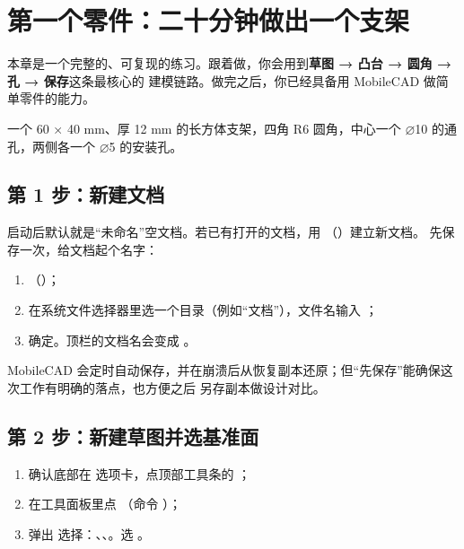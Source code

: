 \chapter{第一个零件：二十分钟做出一个支架}

本章是一个完整的、可复现的练习。跟着做，你会用到\textbf{草图 → 凸台 → 圆角 → 孔 → 保存}这条最核心的
建模链路。做完之后，你已经具备用 MobileCAD 做简单零件的能力。

\begin{practice}[练习目标]
一个 60 × 40 mm、厚 12 mm 的长方体支架，四角 R6 圆角，中心一个 ⌀10 的通孔，两侧各一个 ⌀5 的安装孔。
\end{practice}

\section{第 1 步：新建文档}

启动后默认就是“未命名”空文档。若已有打开的文档，用 （）建立新文档。
先保存一次，给文档起个名字：

\begin{enumerate}
  \item {}（）；
  \item 在系统文件选择器里选一个目录（例如“文档”），文件名输入 ；
  \item 确定。顶栏的文档名会变成 。
\end{enumerate}

\begin{tip}[为什么先保存？]
MobileCAD 会定时自动保存，并在崩溃后从恢复副本还原；但“先保存”能确保这次工作有明确的落点，也方便之后
另存副本做设计对比。
\end{tip}

\section{第 2 步：新建草图并选基准面}

\begin{enumerate}
  \item 确认底部在  选项卡，点顶部工具条的 ；
  \item 在工具面板里点 （命令 ）；
  \item 弹出  选择：、、。选 。
\end{enumerate}


